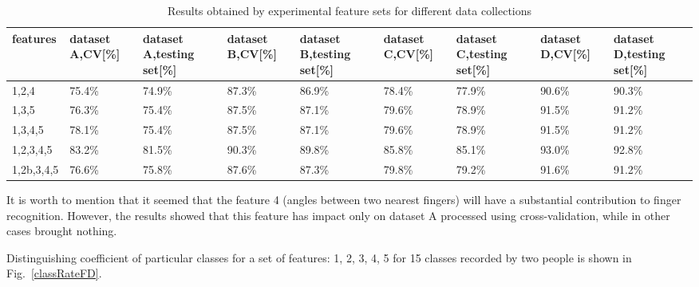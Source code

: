\begin{table}[htp!]
\begin{center}
	\label{findiff}
	\caption{Results obtained by experimental feature sets for different data collections}
    \begin{tabular}{p{1.3cm}p{1.1cm}p{1.1cm}p{1.1cm}p{1.1cm}p{1.1cm}p{1.1cm}p{1.1cm}p{1.1cm}}
    \hline 
    features & dataset A,\linebreak CV[\%] & dataset A,\linebreak testing set[\%] & dataset B,\linebreak CV[\%] & dataset B,\linebreak testing set[\%] & dataset C,\linebreak CV[\%]& dataset C,\linebreak testing set[\%]  & dataset D,\linebreak CV[\%] & dataset D,\linebreak testing set[\%]  \\ \hline \hline
    1,2,4	& 75.4\% & 74.9\% & 87.3\%  & 86.9\% & 78.4\% & 77.9\% & 90.6\% & 90.3\% \\ \hline
    1,3,5     	& 76.3\% & 75.4\% & 87.5\%  & 87.1\% & 79.6\% & 78.9\% & 91.5\% & 91.2\% \\ \hline
    1,3,4,5    	& 78.1\% & 75.4\% & 87.5\%  & 87.1\% & 79.6\% & 78.9\% & 91.5\% & 91.2\% \\ \hline
    1,2,3,4,5   & 83.2\% & 81.5\% & 90.3\%  & 89.8\% & 85.8\% & 85.1\% & 93.0\% & 92.8\% \\ \hline
    1,2b,3,4,5	& 76.6\% & 75.8\% & 87.6\%  & 87.3\% & 79.8\% & 79.2\% & 91.6\% & 91.2\% \\ \hline
    \end{tabular}
    \end{center}
\end{table}

It is worth to mention that it seemed that the feature 4 (angles between two nearest fingers) will have a substantial contribution to finger recognition. However, the results showed that this feature has impact only on dataset A processed using cross-validation, while in other cases brought nothing.

Distinguishing coefficient of particular classes for a set of features: 1, 2, 3, 4, 5 for 15 classes recorded by two people is shown in Fig.~\ref{classRateFD}.

